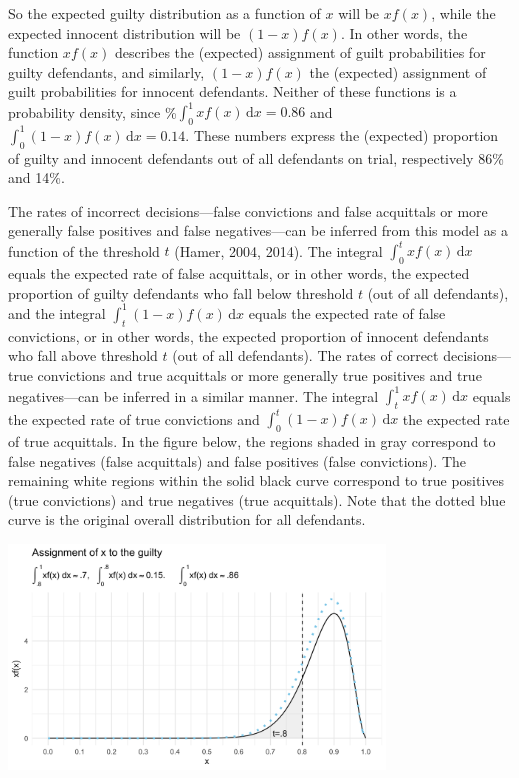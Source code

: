 \documentclass[
  10pt,
  dvipsnames,enabledeprecatedfontcommands]{scrartcl}
\begin{document}
So the expected guilty distribution as a function of \(x\) will be
\(x f(x)\), while the expected innocent distribution will be
\((1-x)f(x)\). In other words, the function \(xf(x)\) describes the
(expected) assignment of guilt probabilities for guilty defendants, and
similarly, \((1-x)f(x)\) the (expected) assignment of guilt
probabilities for innocent defendants. Neither of these functions is a
probability density, since \%\(\int_0^1 \! xf(x) \, \mathrm{d}x=0.86\)
and \(\int_0^1 \! (1-x)f(x) \, \mathrm{d}x=0.14\). These numbers express
the (expected) proportion of guilty and innocent defendants out of all
defendants on trial, respectively 86\% and 14\%.

The rates of incorrect decisions---false convictions and false
acquittals or more generally false positives and false negatives---can
be inferred from this model as a function of the threshold \(t\) (Hamer,
2004, 2014). The integral \(\int_0^t \! xf(x) \, \mathrm{d}x\) equals
the expected rate of false acquittals, or in other words, the expected
proportion of guilty defendants who fall below threshold \(t\) (out of
all defendants), and the integral
\(\int_t^1 \! (1-x)f(x) \, \mathrm{d}x\) equals the expected rate of
false convictions, or in other words, the expected proportion of
innocent defendants who fall above threshold \(t\) (out of all
defendants). The rates of correct decisions---true convictions and true
acquittals or more generally true positives and true negatives---can be
inferred in a similar manner. The integral
\(\int_t^1 \! xf(x) \, \mathrm{d}x\) equals the expected rate of true
convictions and \(\int_0^t \! (1-x)f(x) \, \mathrm{d}x\) the expected
rate of true acquittals. In the figure below, the regions shaded in gray
correspond to false negatives (false acquittals) and false positives
(false convictions). The remaining white regions within the solid black
curve correspond to true positives (true convictions) and true negatives
(true acquittals). Note that the dotted blue curve is the original
overall distribution for all defendants.

\begin{center}
    \includegraphics[width=10cm]{xfx3.png}
\end{center}
\end{document}
